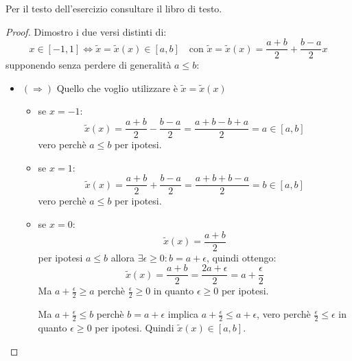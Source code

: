 \begin{exercise}[4.12]
\label{exercise:exercise412}
Per il testo dell'esercizio consultare il libro di testo.
\end{exercise}
\begin{proof}
	Dimostro i due versi distinti di:
	\begin{displaymath}
	x \in [-1,1] \Leftrightarrow \tilde{x} = \tilde{x}(x) \in
	[a, b] \quad \text{con } \tilde{x} = \tilde{x}(x) = \frac{a + b}{2} +
	\frac{b-a}{2}x
	\end{displaymath}
	supponendo senza perdere di generalit\`a $a \leq b$:
	\begin{itemize}
	  \item $(\Rightarrow)$ Quello che voglio utilizzare \`e $\tilde{x} =
	  \tilde{x}(x)$
		\begin{itemize}
	  		\item se $x = -1$:
	  		\begin{displaymath}
	  			\tilde{x}(x) = \frac{a + b}{2} - \frac{b-a}{2} = 
	  			\frac{a + b - b +a}{2} = a \in [a,b]
	  		\end{displaymath}
	  		vero perch\`e $a \leq b$ per ipotesi.
	  		\item se $x = 1$:
	  		\begin{displaymath}
	  			\tilde{x}(x) = \frac{a + b}{2} + \frac{b-a}{2} = 
	  			\frac{a + b + b -a}{2} = b \in [a,b]
	  		\end{displaymath}
	  		vero perch\`e $a \leq b$ per ipotesi.
	  		\item se $x = 0$:
	  		\begin{displaymath}
	  			\tilde{x}(x) = \frac{a + b}{2} 
	  		\end{displaymath}
	  		per ipotesi $a \leq b$ allora $\exists \epsilon \geq 0: b = a + \epsilon$,
	  		quindi ottengo:
	  		\begin{displaymath}
	  			\tilde{x}(x) = \frac{a + b}{2} = \frac{2a + \epsilon}{2} =
	  				a + \frac{\epsilon}{2}   
	  		\end{displaymath}
	  		Ma $a + \frac{\epsilon}{2} \geq a$ perch\`e $\frac{\epsilon}{2} \geq 0$ 
	  		in quanto $\epsilon \geq 0$ per ipotesi.
	  		
	  		Ma $a + \frac{\epsilon}{2} \leq b$ perch\`e $b = a + \epsilon$ implica
	  		$a + \frac{\epsilon}{2} \leq a + \epsilon$, vero perch\`e
	  		$\frac{\epsilon}{2} \leq \epsilon$ in quanto $\epsilon \geq 0$ per ipotesi.
	  		Quindi $\tilde{x}(x) \in [a,b]$.
		\end{itemize}  
		

\end{itemize}
\end{proof}
